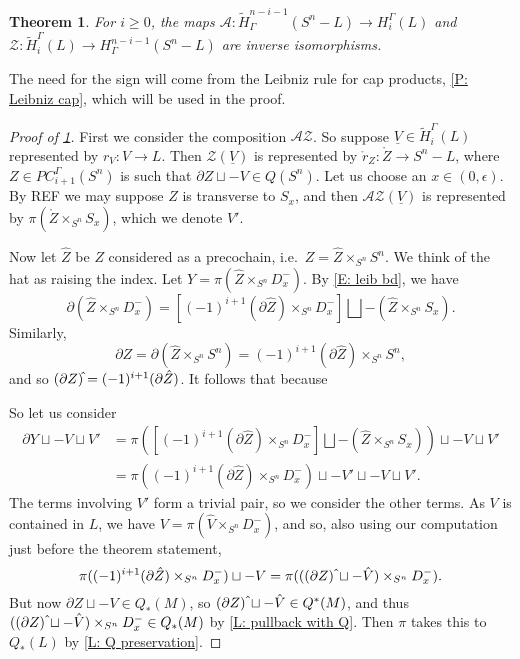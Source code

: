 \documentclass[12pt]{article}
\theoremstyle{plain}
\newtheorem{theorem}{Theorem}[section]
\theoremstyle{definition}
\theoremstyle{remark}
\newcommand{\uV}{\underline{V}}
\newcommand{\td}[1]{\tilde{#1}}
\newcommand{\bd}{\partial}
\newcommand{\mc}[1]{\mathcal{#1}}
\begin{document}
\begin{theorem}\label{T: alex duality}
For $i \geq 0$, the maps  $\mc A \colon \td H^{n-i-1}_\Gamma(S^n-L) \to H_i^\Gamma(L)$ and $\mc Z \colon \td H_i^\Gamma(L) \to H^{n-i-1}_\Gamma(S^n-L)$ are inverse isomorphisms.
\end{theorem}
The need for the sign will come from the Leibniz rule for cap products, \cref{P: Leibniz cap}, which will be used in the proof.


\begin{proof}[Proof of \cref{T: alex duality}]
First we consider the composition $\mc A \mc Z$.
So suppose $\uV \in \td H_i^\Gamma(L)$ represented by $r_V \colon V \to L$.
Then $\mc Z(\uV)$ is represented by $\mathring r_Z \colon \mathring Z \to S^n-L$, where $Z \in PC_{i+1}^\Gamma(S^n)$ is such that $\bd Z \sqcup -V \in Q(S^n)$.
Let us choose an $x \in (0,\epsilon)$.
By REF we may suppose $Z$ is transverse to $S_x$, and then $\mc A \mc Z(\uV)$ is represented by $\pi(\mathring Z \times_{S^n} S_x)$, which we denote $V'$.

Now let $\hat Z$ be $Z$ considered as a precochain, i.e.\ $Z = \hat Z \times_{S^n} S^n$.
We think of the hat as raising the index.
Let $Y = \pi(\hat Z \times_{S^n} D_x^-)$.
By \eqref{E: leib bd}, we have
$$\bd (\hat Z \times_{S^n} D_x^-) = \left[(-1)^{i+1} (\bd \hat Z) \times_{S^n} D_x^-\right] \bigsqcup - (\hat Z \times_{S^n} S_x).$$
Similarly, $$\bd Z = \bd(\hat Z \times_{S^n} S^n) = (-1)^{i+1} (\bd \hat Z) \times_{S^n} S^n,$$
and so $(\bd Z)\hat{\vrule height1.3ex width0pt} = (-1)^{i+1} (\bd \hat Z)$.
It follows that because

So let us consider
\begin{align*}
\bd Y \sqcup -V\sqcup V'&=
\pi(\left[(-1)^{i+1} (\bd \hat Z) \times_{S^n} D_x^-\right] \bigsqcup - (\hat Z \times_{S^n} S_x))\sqcup -V \sqcup V'\\
&=\pi((-1)^{i+1} (\bd \hat Z) \times_{S^n} D_x^-) \sqcup -V' \sqcup -V \sqcup V'.
\end{align*}
The terms involving $V'$ form a trivial pair, so we consider the other terms.
As $V$ is contained in $L$, we have $V = \pi(\hat V \times_{S^n} D_x^-)$, and so, also using our computation just before the theorem statement,
$$\pi((-1)^{i+1} (\bd \hat Z) \times_{S^n} D_x^-) \sqcup -V = \pi(((\bd  Z)\,\hat{\vrule height1.3ex width0pt} \sqcup -\hat V) \times_{S^n} D_x^-).$$
But now $\bd Z \sqcup -V \in Q_*(M)$, so $(\bd  Z)\,\hat{\vrule height1.3ex width0pt} \sqcup -\hat V \in Q^*(M)$, and thus $((\bd  Z)\,\hat{\vrule height1.3ex width0pt} \sqcup -\hat V) \times_{S^n} D_x^- \in Q_*(M)$ by \cref{L: pullback with Q}.
Then $\pi$ takes this to $Q_*(L)$ by \cref{L: Q preservation}.


\end{proof}
\end{document}
